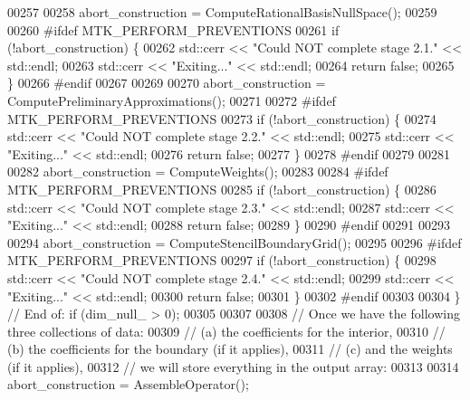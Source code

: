 \begin{DoxyCode}
{{00257 
00258     abort\_construction = ComputeRationalBasisNullSpace();
00259 
00260 \textcolor{preprocessor}{    #ifdef MTK\_PERFORM\_PREVENTIONS}
00261     \textcolor{keywordflow}{if} (!abort\_construction) \{
00262       std::cerr << \textcolor{stringliteral}{"Could NOT complete stage 2.1."} << std::endl;
00263       std::cerr << \textcolor{stringliteral}{"Exiting..."} << std::endl;
00264       \textcolor{keywordflow}{return} \textcolor{keyword}{false};
00265     \}
00266 \textcolor{preprocessor}{    #endif}
00267 
00269 
00270     abort\_construction = ComputePreliminaryApproximations();
00271 
00272 \textcolor{preprocessor}{    #ifdef MTK\_PERFORM\_PREVENTIONS}
00273     \textcolor{keywordflow}{if} (!abort\_construction) \{
00274       std::cerr << \textcolor{stringliteral}{"Could NOT complete stage 2.2."} << std::endl;
00275       std::cerr << \textcolor{stringliteral}{"Exiting..."} << std::endl;
00276       \textcolor{keywordflow}{return} \textcolor{keyword}{false};
00277     \}
00278 \textcolor{preprocessor}{    #endif}
00279 
00281 
00282     abort\_construction = ComputeWeights();
00283 
00284 \textcolor{preprocessor}{    #ifdef MTK\_PERFORM\_PREVENTIONS}
00285     \textcolor{keywordflow}{if} (!abort\_construction) \{
00286       std::cerr << \textcolor{stringliteral}{"Could NOT complete stage 2.3."} << std::endl;
00287       std::cerr << \textcolor{stringliteral}{"Exiting..."} << std::endl;
00288       \textcolor{keywordflow}{return} \textcolor{keyword}{false};
00289     \}
00290 \textcolor{preprocessor}{    #endif}
00291 
00293 
00294     abort\_construction = ComputeStencilBoundaryGrid();
00295 
00296 \textcolor{preprocessor}{    #ifdef MTK\_PERFORM\_PREVENTIONS}
00297     \textcolor{keywordflow}{if} (!abort\_construction) \{
00298       std::cerr << \textcolor{stringliteral}{"Could NOT complete stage 2.4."} << std::endl;
00299       std::cerr << \textcolor{stringliteral}{"Exiting..."} << std::endl;
00300       \textcolor{keywordflow}{return} \textcolor{keyword}{false};
00301     \}
00302 \textcolor{preprocessor}{    #endif}
00303 
00304   \} \textcolor{comment}{// End of: if (dim\_null\_ > 0);}
00305 
00307 
00308   \textcolor{comment}{// Once we have the following three collections of data:}
00309   \textcolor{comment}{//   (a) the coefficients for the interior,}
00310   \textcolor{comment}{//   (b) the coefficients for the boundary (if it applies),}
00311   \textcolor{comment}{//   (c) and the weights (if it applies),}
00312   \textcolor{comment}{// we will store everything in the output array:}
00313 
00314   abort\_construction = AssembleOperator();
}}
\end{DoxyCode}
